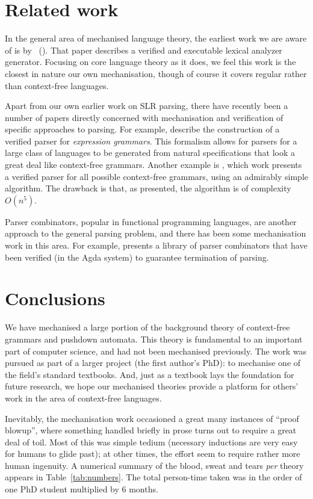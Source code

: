 \section{Related work}

In the general area of mechanised language theory, the earliest work we are aware of is by \citeauthor{nipkow98}~(\citeyear{nipkow98}).
That paper describes a verified and executable lexical analyzer generator.
%
Focusing on core language theory as it does, we feel this work is the closest in nature our own mechanisation, though of course it covers regular rather than context-free languages.

Apart from our own earlier work on SLR parsing, there have recently been a number of papers directly concerned with mechanisation and verification of specific approaches to parsing.
For example, \cite{koprowski11:trx} describe the construction of a verified parser for \emph{expression grammars}.
This formalism allows for parsers for a large class of languages to be generated from natural specifications that look a great deal like context-free grammars.
Another example is \cite{ridge2011:cfg-parsing}, which work presents a verified parser for all possible context-free grammars, using an admirably simple algorithm.
The drawback is that, as presented, the algorithm is of complexity~$O(n^5)$.

Parser combinators, popular in functional programming languages, are another approach to the general parsing problem, and there has been some mechanisation work in this area.
For example, \citet{Danielsson2010:TPC} presents a library of parser combinators that have been verified (in the Agda system) to guarantee termination of parsing.


\section{Conclusions}

We have mechanised a large portion of the background theory of context-free grammars and pushdown automata.
%
This theory is fundamental to an important part of computer science, and had not been mechanised previously.
%
The work was pursued as part of a larger project (the first author's PhD): to mechanise one of the field's standard textbooks.
And, just as a textbook lays the foundation for future research, we hope our mechanised theories provide a platform for others' work in the area of context-free languages.
%

Inevitably, the mechanisation work occasioned a great many instances of ``proof blowup'', where something handled briefly in prose turns out to require a great deal of toil.
Most of this was simple tedium (necessary inductions are very easy for humans to glide past); at other times, the effort seem to require rather more human ingenuity.
A numerical summary of the blood, sweat and tears \emph{per} theory appears in Table~\ref{tab:numbers}.
The total person-time taken was in the order of one PhD student multiplied by 6 months.

